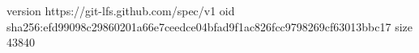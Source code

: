 version https://git-lfs.github.com/spec/v1
oid sha256:efd99098c29860201a66e7ceedce04bfad9f1ac826fcc9798269cf63013bbc17
size 43840
